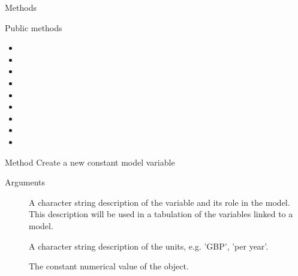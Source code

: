 \documentclass[a4paper]{book}
\begin{document}
\begin{Section}{Methods}
%
\begin{SubSection}{Public methods}
\begin{itemize}

\item{} 
\item{} 
\item{} 
\item{} 
\item{} 
\item{} 
\item{} 
\item{} 
\item{} 

\end{itemize}

\end{SubSection}




\hypertarget{method-new}{}
%
\begin{SubSection}{Method }
Create a new constant model variable
%


%
\begin{SubSubSection}{Arguments}

\begin{description}

\item[] A character string description of the variable
and its role in the
model. This description will be used in a tabulation of the
variables linked to a model.

\item[] A character string description of the units, e.g. 'GBP',
'per year'.

\item[] The constant numerical value of the object.


\end{description}
\end{SubSubSection}
\end{SubSection}
\end{Section}
\end{document}
